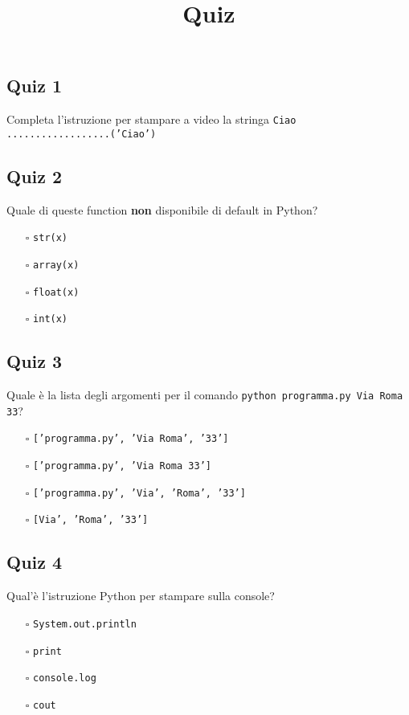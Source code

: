 \documentclass{article}
\title{Quiz}
\begin{document}
\pagestyle{fancy}
\fancyhf{}

\subsection*{Quiz 1}
Completa l'istruzione per stampare a video la stringa \texttt{Ciao}\\
\verb|..................|\texttt{('Ciao')}\subsection*{Quiz 2}
Quale di queste function \textbf{non} disponibile di default in Python?
\begin{itemize}
  \item[$\square$] \texttt{str(x)}
  \item[$\square$] \texttt{array(x)}
  \item[$\square$] \texttt{float(x)}
  \item[$\square$] \texttt{int(x)}
\end{itemize}
\subsection*{Quiz 3}
Quale è la lista degli argomenti per il comando \texttt{python programma.py Via Roma 33}?
\begin{itemize}
  \item[$\square$] \texttt{['programma.py', 'Via Roma', '33']}
  \item[$\square$] \texttt{['programma.py', 'Via Roma 33']}
  \item[$\square$] \texttt{['programma.py', 'Via', 'Roma', '33']}
  \item[$\square$] \texttt{[Via', 'Roma', '33']}
\end{itemize}
\subsection*{Quiz 4}
Qual'è l'istruzione Python per stampare sulla console?
\begin{itemize}
  \item[$\square$] \texttt{System.out.println}
  \item[$\square$] \texttt{print}
  \item[$\square$] \texttt{console.log}
  \item[$\square$] \texttt{cout}
\end{itemize}
\end{document}

